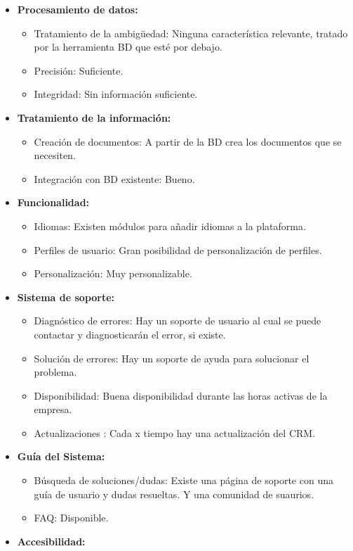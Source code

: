 \documentclass{article}
\begin{document}
\begin{itemize}
\begin{itemize}
\begin{itemize}
\end{itemize}
\item \textbf{Procesamiento de datos:}
\begin{itemize}
\item Tratamiento de la ambigüedad:  Ninguna característica relevante, tratado por la herramienta BD que esté por debajo. 
\item Precisión: Suficiente. 
\item Integridad: Sin información suficiente.
\end{itemize}
\item \textbf{Tratamiento de la información:}
\begin{itemize}
\item Creación de documentos: A partir de la BD crea los documentos que se necesiten. 
\item Integración con BD existente: Bueno.
\end{itemize}
\item \textbf{Funcionalidad:}
\begin{itemize}
\item Idiomas: Existen módulos para añadir idiomas a la plataforma. 
\item Perfiles de usuario: Gran posibilidad de personalización de perfiles. 
\item Personalización: Muy  personalizable. 
\end{itemize}
\item \textbf{Sistema de soporte:}
\begin{itemize}
\item Diagnóstico de errores: Hay un soporte de usuario al cual se puede contactar y diagnosticarán el error, si existe. 
\item Solución de errores: Hay un soporte de ayuda para solucionar el problema.   
\item Disponibilidad: Buena disponibilidad durante las horas activas de la empresa. 
\item Actualizaciones : Cada x tiempo hay una actualización del CRM. 
\end{itemize}
\item \textbf{Guía del Sistema:}
\begin{itemize}
\item Búsqueda de soluciones/dudas: Existe una página de soporte con una guía de usuario y dudas resueltas. Y una comunidad de suaurios. 
\item FAQ: Disponible.
\end{itemize}
\item \textbf{Accesibilidad:}

\end{itemize}
\end{itemize}
\end{document}
